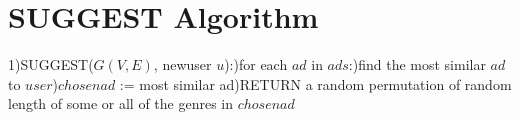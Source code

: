 \documentclass{article}
\newcommand\tab[1][1cm]{\hspace*{#1}}
\begin{document}
\section{\textbf{SUGGEST} Algorithm}
1)\tab  SUGGEST($G(V, E)$, newuser $u$):)\tab\tab for each $ad$ in $ads$:)\tab\tab\tab find the most similar $ad$ to $user$)\tab\tab $chosenad$ := most similar ad)\tab RETURN a random permutation of random length of some or all of the genres in $chosenad$\newline\newline
\end{document}
